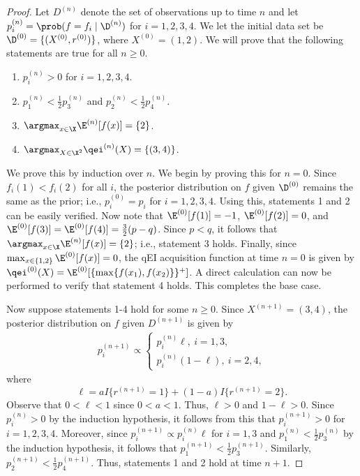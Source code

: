 \documentclass[
  letterpaper,
  DIV=11,
  numbers=noendperiod,
  oneside]{scrreprt}
\theoremstyle{remark}
\begin{document}
\begin{proof}
Let \(D^{(n)}\) denote the set of observations up to time \(n\) and let
\(p_i^{(n)} = \prob(f=f_i \mid \D^{(n)})\) for \(i=1,2,3,4\). We let the
initial data set be \(\D^{(0)} = \{(X^{(0)}, r^{(0)})\}\), where
\(X^{(0)}= (1,2)\). We will prove that the following statements are true
for all \(n\geq 0\).

\begin{enumerate}
\def\labelenumi{\arabic{enumi}.}
\item
  \(p_i^{(n)} > 0\) for \(i=1,2,3,4\).
\item
  \(p_1^{(n)} < \frac{1}{2}p_3^{(n)}\) and
  \(p_2^{(n)} < \frac{1}{2}p_4^{(n)}\).
\item
  \(\argmax_{x\in\X}\E^{(n)}[f(x)]=\{2\}\).
\item
  \(\argmax_{X\in\X^2}\qei^{(n)}(X) = \{(3, 4)\}\).
\end{enumerate}

We prove this by induction over \(n\). We begin by proving this for
\(n=0\). Since \(f_i(1) < f_i(2)\) for all \(i\), the posterior
distribution on \(f\) given \(\D^{(0)}\) remains the same as the prior;
i.e., \(p_i^{(0)} = p_i\) for \(i=1,2,3,4\). Using this, statements 1
and 2 can be easily verified. Now note that \(\E^{(0)}[f(1)]=-1\),
\(\E^{(0)}[f(2)]=0\), and
\(\E^{(0)}[f(3)] = \E^{(0)}[f(4)] = \frac{3}{2}(p - q)\). Since
\(p < q\), it follows that \(\argmax_{x\in\X}\E^{(n)}[f(x)]=\{2\}\);
i.e., statement 3 holds. Finally, since
\(\max_{x\in\{1,2\}}\E^{(0)}[f(x)] = 0\), the qEI acquisition function
at time \(n=0\) is given by
\(\qei^{(0)}(X) = \E^{(0)}[\{\max\{f(x_1), f(x_2)\}\}^+]\). A direct
calculation can now be performed to verify that statement 4 holds. This
completes the base case.

Now suppose statements 1-4 hold for some \(n\geq 0\). Since
\(X^{(n+1)} = (3, 4)\), the posterior distribution on \(f\) given
\(D^{(n+1)}\) is given by \[\begin{aligned}
p_i^{(n+1)} \propto \begin{cases}
                        p_i^{(n)}\ell, \ i=1,3,\\
                         p_i^{(n)} (1 - \ell), \ i=2,4,
                        \end{cases}
\end{aligned}\] where
\[\ell = a I\{r^{(n+1)} = 1\} + (1-a)I\{r^{(n+1)} = 2\}.\] Observe that
\(0< \ell < 1\) since \(0 < a < 1\). Thus, \(\ell > 0\) and
\(1-\ell > 0\). Since \(p_i^{(n)} > 0\) by the induction hypothesis, it
follows from this that \(p_i^{(n+1)} > 0\) for \(i=1,2,3,4\). Moreover,
since \(p_i^{(n+1)} \propto p_i^{(n)}\ell\) for \(i=1,3\) and
\(p_1^{(n)} < \frac{1}{2}p_3^{(n)}\) by the induction hypothesis, it
follows that \(p_1^{(n+1)} < \frac{1}{2}p_3^{(n+1)}\). Similarly,
\(p_2^{(n+1)} < \frac{1}{2}p_4^{(n+1)}\). Thus, statements 1 and 2 hold
at time \(n+1\).


\end{proof}
\end{document}
